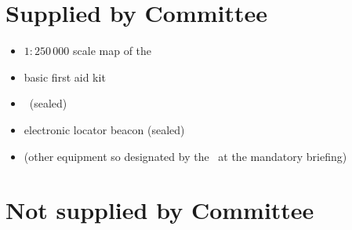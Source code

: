 \documentclass[12pt]{report}
\begin{document}
  \section{Supplied by Committee}
  \begin{itemize}
  \renewcommand\labelitemi{}
  \item $1:250\,000$ scale map of the \coursearea
  \item  basic first aid kit
  \item  \TeamEnvelope\ (sealed)
  \item electronic locator beacon (sealed)
  \item (other equipment so designated by the \RaceDirector\ at the mandatory briefing)
  \end{itemize}
  \section{Not supplied by Committee}
\end{document}
